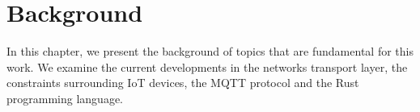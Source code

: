 \chapter{Background}

In this chapter, we present the background of topics that are fundamental for this work.
We examine the current developments in the networks transport layer, the constraints surrounding IoT devices, the MQTT protocol and the Rust programming language.




